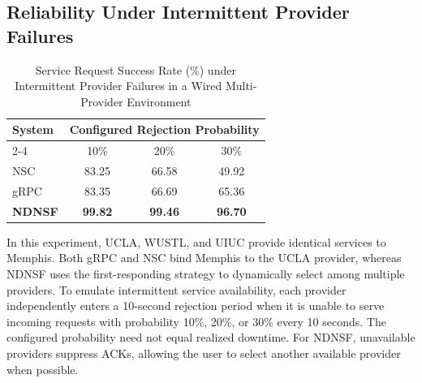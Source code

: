\subsection{Reliability Under Intermittent Provider Failures}
\label{sec:intermittent-provider-failures}

\begin{table}[t]
  \centering
  \caption{
    Service Request Success Rate (\%) under Intermittent Provider Failures in a Wired Multi-Provider Environment
  }
  \label{tab:success_rate_wired_intermittent}

  \small
  \setlength{\tabcolsep}{8pt}

  \begin{tabular}{lccc}
    \toprule

    \multirow{2}{*}{System}
      & \multicolumn{3}{c}{Configured Rejection Probability} \\

    \cmidrule(lr){2-4}

      & 10\%
      & 20\%
      & 30\% \\

    \midrule

    NSC
      & 83.25
      & 66.58
      & 49.92 \\

    gRPC
      & 83.35
      & 66.69
      & 65.36 \\

    \textbf{NDNSF}
      & \textbf{99.82}
      & \textbf{99.46}
      & \textbf{96.70} \\

    \bottomrule
  \end{tabular}
  \vspace{-3mm}
\end{table}

In this experiment, UCLA, WUSTL, and UIUC provide identical services to Memphis. Both gRPC and NSC bind Memphis to the UCLA provider, whereas NDNSF uses the first-responding strategy to dynamically select among multiple providers. To emulate intermittent service availability, each provider independently enters a 10-second rejection period when it is unable to serve incoming requests with probability 10\%, 20\%, or 30\% every 10 seconds. The configured probability need not equal realized downtime. For NDNSF, unavailable providers suppress ACKs, allowing the user to select another available provider when possible.

